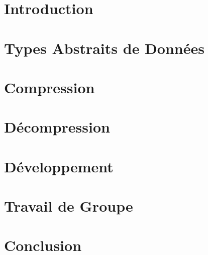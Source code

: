 \documentclass[10pt]{report}
\begin{document}
    \tableofcontents

    \chapter{Introduction} 
        
    
    \chapter{Types Abstraits de Données}
        

    \chapter{Compression}
        
    
    \chapter{Décompression}
        

    \chapter{Développement}
        

    \chapter{Travail de Groupe}
        

    \chapter{Conclusion}
        
\end{document}
